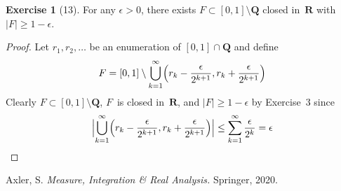 \documentclass[letterpaper,12pt]{article}
\newcommand{\Q}{\mathbf{Q}}
\newcommand{\R}{\mathbf{R}}
\newcommand{\bigunion}{\bigcup}
\newcommand{\sect}{\cap}
\newcommand{\m}[1]{|#1|}
\newcommand{\bigmeasure}[1]{\Bigl|#1\Bigr|}
\theoremstyle{definition}
\newtheorem*{exer}{Exercise}
\theoremstyle{remark}
\begin{document}
\begin{exer}[13]
For any \(\epsilon>0\), there exists \(F\subset[0,1]\setminus\Q\) closed in~\(\R\) with \(\m{F}\ge1-\epsilon\).
\end{exer}
\begin{proof}
Let \(r_1,r_2,\ldots\) be an enumeration of \([0,1]\sect\Q\) and define
\[F=[0,1]\setminus\bigunion_{k=1}^{\infty}\Bigl(r_k-\frac{\epsilon}{2^{k+1}},r_k+\frac{\epsilon}{2^{k+1}}\Bigr)\]
Clearly \(F\subset[0,1]\setminus\Q\), \(F\)~is closed in~\(\R\), and \(\m{F}\ge1-\epsilon\) by Exercise~3 since
\[\bigmeasure{\bigunion_{k=1}^{\infty}\Bigl(r_k-\frac{\epsilon}{2^{k+1}},r_k+\frac{\epsilon}{2^{k+1}}\Bigr)}\le\sum_{k=1}^{\infty}\frac{\epsilon}{2^k}=\epsilon\qedhere\]
\end{proof}

\newpage
\begin{thebibliography}{0}
 Axler, S. \textit{Measure, Integration \& Real Analysis.} Springer, 2020.
\end{thebibliography}
\end{document}
